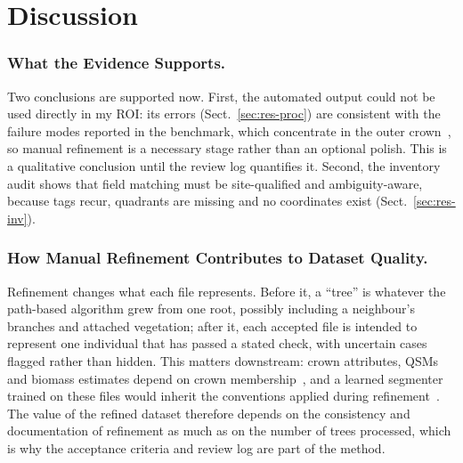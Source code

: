 \documentclass[runningheads]{llncs}
\begin{document}
\section{Discussion}\label{sec:discussion}

\subsubsection{What the Evidence Supports.}
Two conclusions are supported now. First, the automated output could not be used directly in my ROI: its errors (Sect.~\ref{sec:res-proc}) are consistent with the failure modes reported in the benchmark, which concentrate in the outer crown~\cite{cherlet2026}, so manual refinement is a necessary stage rather than an optional polish. This is a qualitative conclusion until the review log quantifies it. Second, the inventory audit shows that field matching must be site-qualified and ambiguity-aware, because tags recur, quadrants are missing and no coordinates exist (Sect.~\ref{sec:res-inv}).

\subsubsection{How Manual Refinement Contributes to Dataset Quality.}
Refinement changes what each file represents. Before it, a ``tree'' is whatever the path-based algorithm grew from one root, possibly including a neighbour's branches and attached vegetation; after it, each accepted file is intended to represent one individual that has passed a stated check, with uncertain cases flagged rather than hidden. This matters downstream: crown attributes, QSMs and biomass estimates depend on crown membership~\cite{calders2020}, and a learned segmenter trained on these files would inherit the conventions applied during refinement~\cite{cherlet2026}. The value of the refined dataset therefore depends on the consistency and documentation of refinement as much as on the number of trees processed, which is why the acceptance criteria and review log are part of the method.
\end{document}
